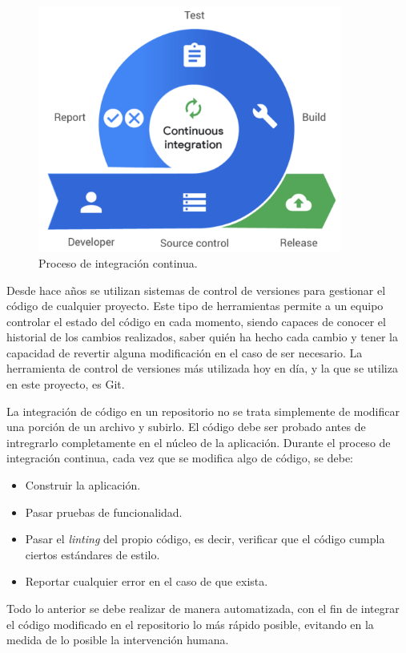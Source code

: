 \begin{figure}
  \centerline{\includegraphics[width=10cm]{figuras/ci}}
  \caption{Proceso de integración continua\cite{img:ci}.}
  \label{fig:ci}
\end{figure}

Desde hace años se utilizan sistemas de control de versiones para gestionar el código de cualquier proyecto. Este tipo de herramientas permite a un equipo controlar el estado del código en cada momento, siendo capaces de conocer el historial de los cambios realizados, saber quién ha hecho cada cambio y tener la capacidad de revertir alguna modificación en el caso de ser necesario. La herramienta de control de versiones más utilizada hoy en día, y la que se utiliza en este proyecto, es Git\cite{git}.

La integración de código en un repositorio no se trata simplemente de modificar una porción de un archivo y subirlo. El código debe ser probado antes de intregrarlo completamente en el núcleo de la aplicación. Durante el proceso de integración continua, cada vez que se modifica algo de código, se debe:

\begin{itemize}
  \item Construir la aplicación.
  \item Pasar pruebas de funcionalidad.
  \item Pasar el \textit{linting} del propio código, es decir, verificar que el código cumpla ciertos estándares de estilo.
  \item Reportar cualquier error en el caso de que exista.
\end{itemize}

Todo lo anterior se debe realizar de manera automatizada, con el fin de integrar el código modificado en el repositorio lo más rápido posible, evitando en la medida de lo posible la intervención humana.

